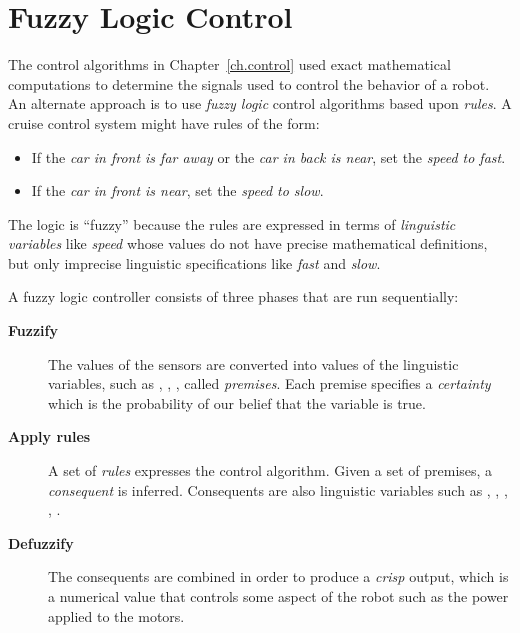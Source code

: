 
\chapter{Fuzzy Logic Control}\label{ch.fuzzy}


The control algorithms in Chapter~\ref{ch.control} used exact mathematical computations to determine the signals used to control the behavior of a robot. An alternate approach is to use \emph{fuzzy logic} control algorithms based upon \emph{rules}. A cruise control system might have rules of the form:
\begin{itemize}
\item If the \emph{car in front is far away} or the \emph{car in back is near},
set the \emph{speed to fast}.
\item If the \emph{car in front is near}, set the \emph{speed to slow}.
\end{itemize}
The logic is ``fuzzy'' because the rules are expressed in terms of \emph{linguistic variables} like \emph{speed} whose values do not have precise mathematical definitions, but only imprecise linguistic specifications like \emph{fast} and \emph{slow}.

A fuzzy logic controller consists of three phases that are run sequentially:

\begin{description}
\item[\textbf{Fuzzify}] The values of the sensors are converted into values of the linguistic variables, such as , , , called \emph{premises}. Each premise specifies a \emph{certainty} which is the probability of our belief that the variable is true.
\item[\textbf{Apply rules}] A set of \emph{rules} expresses the control algorithm. Given a set of prem\-ises, a \emph{consequent} is inferred. Consequents are also linguistic variables such as , , , , .
\item[\textbf{Defuzzify}] The consequents are combined in order to produce a \emph{crisp} output, which is a numerical value that controls some aspect of the robot such as the power applied to the motors.
\end{description}

